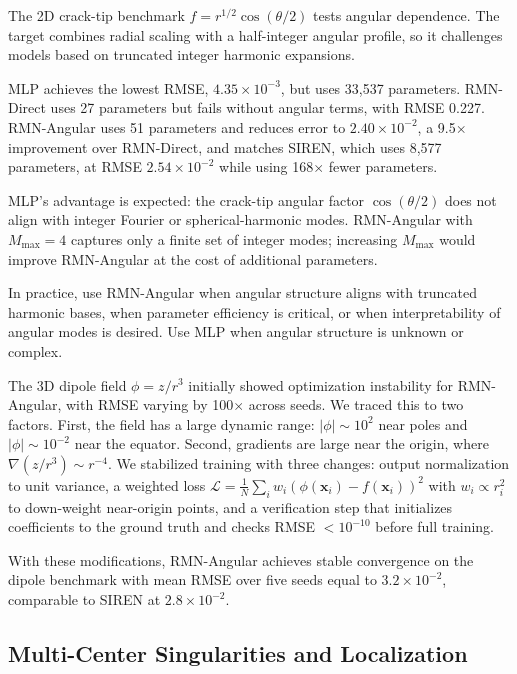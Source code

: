\documentclass[twoside,11pt]{article}
\newcommand{\bx}{\bm{x}}
\begin{document}
The 2D crack-tip benchmark $f = r^{1/2}\cos(\theta/2)$ tests angular dependence. The target combines radial scaling with a half-integer angular profile, so it challenges models based on truncated integer harmonic expansions.

MLP achieves the lowest RMSE, $4.35 \times 10^{-3}$, but uses 33,537 parameters. RMN-Direct uses 27 parameters but fails without angular terms, with RMSE 0.227. RMN-Angular uses 51 parameters and reduces error to $2.40 \times 10^{-2}$, a 9.5$\times$ improvement over RMN-Direct, and matches SIREN, which uses 8,577 parameters, at RMSE $2.54 \times 10^{-2}$ while using 168$\times$ fewer parameters.

MLP's advantage is expected: the crack-tip angular factor $\cos(\theta/2)$ does not align with integer Fourier or spherical-harmonic modes. RMN-Angular with $M_{\max}=4$ captures only a finite set of integer modes; increasing $M_{\max}$ would improve RMN-Angular at the cost of additional parameters.

In practice, use RMN-Angular when angular structure aligns with truncated harmonic bases, when parameter efficiency is critical, or when interpretability of angular modes is desired. Use MLP when angular structure is unknown or complex.

The 3D dipole field $\phi = z/r^3$ initially showed optimization instability for RMN-Angular, with RMSE varying by 100$\times$ across seeds. We traced this to two factors. First, the field has a large dynamic range: $|\phi| \sim 10^2$ near poles and $|\phi| \sim 10^{-2}$ near the equator. Second, gradients are large near the origin, where $\nabla(z/r^3) \sim r^{-4}$. We stabilized training with three changes: output normalization to unit variance, a weighted loss $\mathcal{L} = \frac{1}{N}\sum_i w_i (\phi(\bx_i) - f(\bx_i))^2$ with $w_i \propto r_i^2$ to down-weight near-origin points, and a verification step that initializes coefficients to the ground truth and checks RMSE $< 10^{-10}$ before full training.

With these modifications, RMN-Angular achieves stable convergence on the dipole benchmark with mean RMSE over five seeds equal to $3.2 \times 10^{-2}$, comparable to SIREN at $2.8 \times 10^{-2}$.

\subsection{Multi-Center Singularities and Localization}
\label{subsec:results_multicenter}
\end{document}
